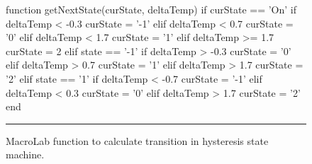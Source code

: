 \begin{figure}
  \begin{macrolab}
function getNextState(curState, deltaTemp)
  if curState == 'On'
    if deltaTemp < -0.3
      curState = '-1' %
    elif deltaTemp < 0.7
      curState = '0' %
    elif deltaTemp < 1.7
      curState = '1' %
    elif deltaTemp >= 1.7
      curState = 2 %
  elif state == '-1'
    if deltaTemp > -0.3
      curState = '0'
    elif deltaTemp > 0.7
      curState = '1'
    elif deltaTemp > 1.7
      curState = '2' 
  elif state == '1'
    if deltaTemp < -0.7
      curState = '-1'
    elif deltaTemp < 0.3
      curState = '0'
    elif deltaTemp > 1.7
      curState = '2'
end
  \end{macrolab}
  \smallskip
  \hrule width 1\columnwidth
  \caption{MacroLab function to calculate transition in hysteresis state
  machine.}
  \label{code:getNextState}
\end{figure}
